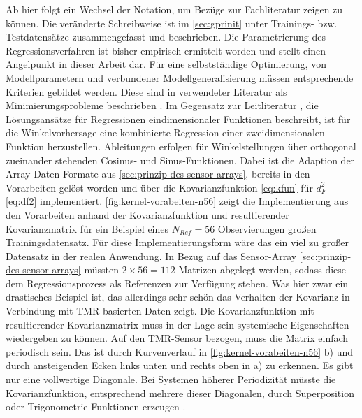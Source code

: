 \clearpage


Ab hier folgt ein Wechsel der Notation, um Bezüge zur Fachliteratur \cite{Rasmussen2006} zeigen zu können. Die veränderte Schreibweise ist im \autoref{sec:gprinit} unter Trainings- bzw. Testdatensätze zusammengefasst und beschrieben.
\newline
Die Parametrierung des Regressionsverfahren ist bisher empirisch ermittelt worden und stellt einen Angelpunkt in dieser Arbeit dar. Für eine selbstständige Optimierung, von Modellparametern und verbundener Modellgeneralisierung müssen entsprechende Kriterien gebildet werden. Diese sind in verwendeter Literatur als Minimierungsprobleme beschrieben \cite{Rasmussen2006}\cite{Guerrero2014}\cite{Lang2014}. 
\newline
Im Gegensatz zur Leitliteratur \cite{Rasmussen2006}, die Lösungsansätze für Regressionen eindimensionaler Funktionen beschreibt, ist für die Winkelvorhersage eine kombinierte Regression einer zweidimensionalen Funktion herzustellen. Ableitungen erfolgen für Winkelstellungen über orthogonal zueinander stehenden Cosinus- und Sinus-Funktionen. Dabei ist die Adaption der Array-Daten-Formate aus \autoref{sec:prinzip-des-sensor-arrays}, bereits in den Vorarbeiten gelöst worden \cite{Schuethe2020} und über die Kovarianzfunktion \autoref{eq:kfun} für $d_F^2$ \autoref{eq:df2} implementiert. \autoref{fig:kernel-vorabeiten-n56} zeigt die Implementierung aus den Vorarbeiten anhand der Kovarianzfunktion und resultierender Kovarianzmatrix für ein Beispiel eines $N_{Ref} = 56$ Observierungen großen Trainingsdatensatz. Für diese Implementierungsform wäre das ein viel zu großer Datensatz in der realen Anwendung. In Bezug auf das Sensor-Array \autoref{sec:prinzip-des-sensor-arrays} müssten $2 \times 56 = 112$ Matrizen abgelegt werden, sodass diese dem Regressionsprozess als Referenzen zur Verfügung stehen. Was hier zwar ein drastisches Beispiel ist, das allerdings sehr schön das Verhalten der Kovarianz in Verbindung mit TMR basierten Daten zeigt.
\newline
Die Kovarianzfunktion mit resultierender Kovarianzmatrix muss in der Lage sein systemische Eigenschaften wiedergeben zu können. Auf den TMR-Sensor \cite{TDK2016} bezogen, muss die Matrix einfach periodisch sein. Das ist durch Kurvenverlauf in \autoref{fig:kernel-vorabeiten-n56} b) und durch ansteigenden Ecken links unten und rechts oben in a) zu erkennen. Es gibt nur eine vollwertige Diagonale. Bei Systemen höherer Periodizität müsste die Kovarianzfunktion, entsprechend mehrere dieser Diagonalen, durch Superposition oder Trigonometrie-Funktionen erzeugen \cite{Rasmussen2006}.


